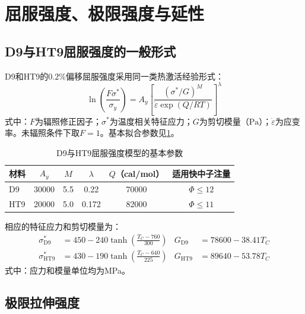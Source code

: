 \section{屈服强度、极限强度与延性}
\label{app:cladding_strength_models}

\subsection{D9与HT9屈服强度的一般形式}

D9和HT9的$0.2\%$偏移屈服强度采用同一类热激活经验形式\cite{hofmanMetallicFuelsHandbook2019}：
\begin{equation}
	\ln\!\left(\frac{F\sigma^*}{\sigma_y}\right)
	=A_y\left[
	\frac{(\sigma^*/G)^M}
	{\dot\varepsilon\exp(Q/RT)}
	\right]^\lambda
	\label{eq:appendix_cladding_yield_strength_general}
\end{equation}
\noindent 式中：$F$为辐照修正因子；$\sigma^*$为温度相关特征应力；$G$为剪切模量（$\mathrm{Pa}$）；$\dot\varepsilon$为应变率。未辐照条件下取$F=1$。基本拟合参数见\tablename\ref{tab:appendix_cladding_yield_parameters}。

\begin{table}[htbp]
	\centering
	\caption{D9与HT9屈服强度模型的基本参数}
	\label{tab:appendix_cladding_yield_parameters}
	\begin{tabular*}{\textwidth}{
			@{\extracolsep{\fill}}
			lccccc
			@{}
		}
		\toprule
		材料 & $A_y$ & $M$ & $\lambda$ & $Q$（cal/mol） & 适用快中子注量 \\
		\midrule
		D9  & 30000 & 5.5 & 0.22  & 70000 & $\varPhi\leq12$ \\
		HT9 & 20000 & 5.0 & 0.172 & 82000 & $\varPhi\leq11$ \\
		\bottomrule
	\end{tabular*}
\end{table}

相应的特征应力和剪切模量为：
\begin{equation}
	\label{eq:appendix_cladding_characteristic_stress}
	\begin{aligned}
		\sigma^*_{\mathrm{D9}}
		&=450-240\tanh\!\left(\frac{T_C-760}{300}\right)
		&
		G_{\mathrm{D9}}&=78600-38.41T_C\\
		\sigma^*_{\mathrm{HT9}}
		&=430-190\tanh\!\left(\frac{T_C-640}{225}\right)
		&
		G_{\mathrm{HT9}}&=89640-53.78T_C
	\end{aligned}
\end{equation}
\noindent 式中：应力和模量单位均为MPa。

\subsection{极限拉伸强度}

